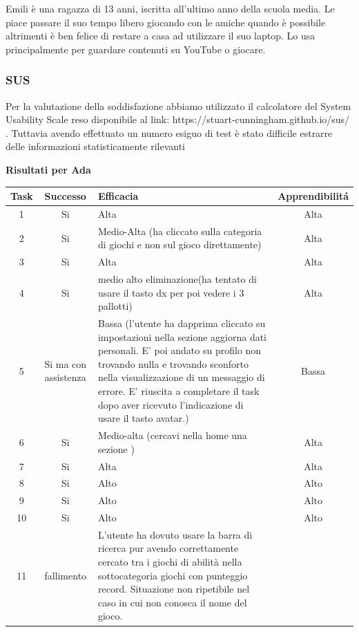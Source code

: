 \documentclass[../Report.tex]{subfiles}
\begin{document}
    Emili è una ragazza di 13 anni, iscritta all’ultimo anno della scuola media. Le piace passare il suo tempo libero giocando con le amiche quando è possibile altrimenti è ben felice di restare a casa ad utilizzare il suo laptop. Lo usa principalmente per guardare contenuti su YouTube o giocare. 

    \subsubsection{SUS}
    Per la valutazione della soddisfazione abbiamo utilizzato il calcolatore del System Usability Scale reso disponibile al link: https://stuart-cunningham.github.io/sus/ . Tuttavia avendo effettuato un numero esiguo di test è stato difficile estrarre delle informazioni statisticamente rilevanti

    \textbf{Risultati per Ada}\\
    \begin{table}[H]
        \begin{tabular}{|c|c|p{5cm}|c|}
            \hline
            Task & Successo & Efficacia & Apprendibilitá \\
            \hline
            1 & Si & Alta & Alta \\
            \hline
            2 & Si & Medio-Alta (ha cliccato sulla categoria di giochi e non sul gioco direttamente) & Alta \\
            \hline
            3 & Si & Alta & Alta \\
            \hline
            4 & Si & medio alto eliminazione(ha tentato di usare il tasto dx per poi vedere i 3 pallotti) & Alta \\
            \hline
            5 & Si ma con assistenza & Bassa (l’utente ha dapprima cliccato su impostazioni nella sezione aggiorna dati personali. E’ poi andato su profilo non trovando nulla e trovando sconforto nella visualizzazione di un messaggio di errore. E’ riuscita a completare il task dopo aver ricevuto l’indicazione di usare il tasto avatar.) & Bassa \\
            \hline
            6 & Si & Medio-alta (cercavi nella home una sezione ) & Alta \\
            \hline
            7 & Si & Alta & Alta \\
            \hline
            8 & Si & Alto & Alto \\
            \hline
            9 & Si & Alto & Alto \\
            \hline
            10 & Si & Alto & Alto \\
            \hline
            11 & fallimento & L’utente ha dovuto usare la barra di ricerca pur avendo correttamente cercato tra i giochi di abilità nella sottocategoria giochi con punteggio record. Situazione non ripetibile nel caso in cui non conosca il nome del gioco.  & \\
            \hline
        \end{tabular}
    \end{table}
\end{document}
